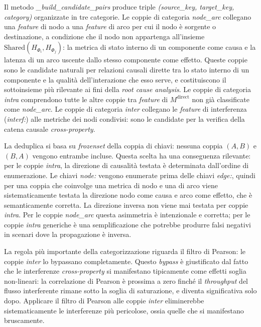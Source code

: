 Il metodo \textit{\_build\_candidate\_pairs} produce triple \textit{(source\_key, target\_key,
category)} organizzate in tre categorie. Le coppie di categoria \textit{node\_arc} collegano una
\textit{feature} di nodo a una \textit{feature} di arco per cui il nodo è sorgente o
destinazione, a condizione che il nodo non appartenga all'insieme
$\text{Shared}(H_{\Phi_i}, H_{\Phi_j})$: la metrica di stato interno di un componente come causa e la latenza di un arco
uscente dallo stesso componente come effetto. Queste coppie sono le candidate naturali per
relazioni causali dirette tra lo stato interno di un componente e la qualità dell'interazione che
esso serve, e costituiscono il sottoinsieme più rilevante ai fini della \textit{root cause
analysis}. Le coppie di categoria \textit{intra} comprendono tutte le altre coppie tra
\textit{feature} di $M^{\text{direct}}$ non già classificate come \textit{node\_arc}. Le coppie
di categoria \textit{inter} collegano le \textit{feature} di interferenza (\textit{interf:}) alle
metriche dei nodi condivisi: sono le candidate per la verifica della catena causale
\textit{cross-property}.

La deduplica si basa su \textit{frozenset} della coppia di chiavi: nessuna coppia $(A, B)$ e
$(B, A)$ vengono entrambe incluse. Questa scelta ha una conseguenza rilevante: per le coppie
\textit{intra}, la direzione di causalità testata è determinata dall'ordine di enumerazione.
Le chiavi \textit{node:} vengono enumerate prima delle chiavi \textit{edge:}, quindi per una
coppia che coinvolge una metrica di nodo e una di arco viene sistematicamente testata la
direzione nodo come causa e arco come effetto, che è semanticamente corretta. La direzione
inversa non viene mai testata per coppie \textit{intra}. Per le coppie \textit{node\_arc} questa asimmetria
è intenzionale e corretta; per le coppie \textit{intra} generiche è una semplificazione che
potrebbe produrre falsi negativi in scenari dove la propagazione è inversa.

La regola più importante della categorizzazione riguarda il filtro di Pearson: le coppie
\textit{inter} lo bypassano completamente. Questo \textit{bypass}
è giustificato dal fatto che le interferenze \textit{cross-property} si manifestano tipicamente
come effetti soglia non-lineari: la correlazione di Pearson è prossima a zero finché il
\textit{throughput} del flusso interferente rimane sotto la soglia di saturazione, e diventa
significativa solo dopo. Applicare il filtro di Pearson alle coppie \textit{inter} eliminerebbe
sistematicamente le interferenze più pericolose, ossia quelle che si manifestano bruscamente.

